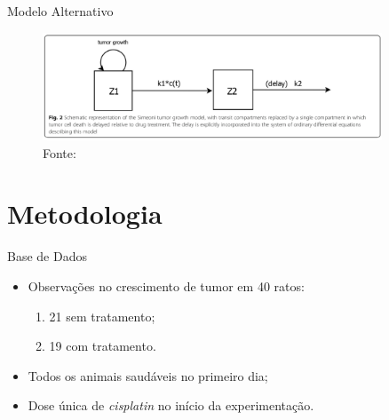 \documentclass{beamer}
\begin{document}
\begin{frame}{Modelo Alternativo}

    \begin{figure}
        \centering
        \includegraphics[width=0.9\textwidth]{pic/proposal.png}
        \hspace*{15pt}\hbox{\scriptsize Fonte:}\\
        \label{fig:map2}
    \end{figure}
    
\end{frame}

\section{Metodologia}

\begin{frame}{Base de Dados}
    
    \begin{itemize}
        \setlength{\itemsep}{10pt}
        \item Observações no crescimento de tumor em 40 ratos:
        \begin{enumerate}
            \vspace{0.2cm}
            \setlength{\itemsep}{10pt}
            \item 21 sem tratamento;
            \item 19 com tratamento.
        \end{enumerate}
        \item Todos os animais saudáveis no primeiro dia;
        \item Dose única de \emph{cisplatin} no início da experimentação.
    \end{itemize}
    
\end{frame}
\end{document}
